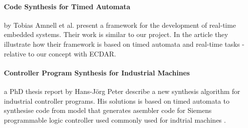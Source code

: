 \paragraph{Code Synthesis for Timed Automata}
by Tobias Amnell et al. present a framework for the development of real-time
embedded systems\cite{Amnell:2002:CST:779110.779112}. Their work is similar to
our project. In the article they illustrate how their framework is based on timed
automata and real-time tasks - relative to our concept with ECDAR.

\paragraph{Controller Program Synthesis for Industrial Machines} a PhD thesis report by Hans-Jörg Peter describe a new synthesis algorithm for industrial controller programs. His solutions is based on timed automata to synthesise code from model that generates asembler code for Siemens programmable logic controller used commonly used for indtrial machines \cite{controller-program-synthesis:2005}.
